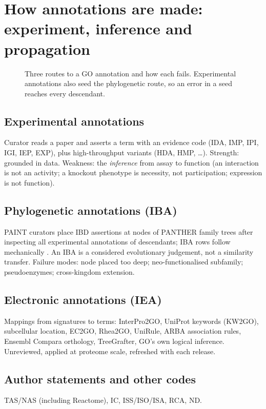 \section{How annotations are made: experiment, inference and propagation}\label{sec:landscape}

\begin{figure}[t]\centering
\resizebox{0.95\linewidth}{!}{}
\caption{Three routes to a GO annotation and how each fails. Experimental annotations also seed
the phylogenetic route, so an error in a seed reaches every descendant.}
\label{fig:provenance}
\end{figure}

\subsection{Experimental annotations}
Curator reads a paper and asserts a term with an evidence code (IDA, IMP, IPI, IGI, IEP, EXP),
plus high-throughput variants (HDA, HMP, \ldots). Strength: grounded in data. Weakness: the
\emph{inference} from assay to function (an interaction is not an activity; a knockout phenotype is
necessity, not participation; expression is not function).

\subsection{Phylogenetic annotations (IBA)}
PAINT curators place IBD assertions at nodes of PANTHER family trees after inspecting all
experimental annotations of descendants; IBA rows follow mechanically \citep{todo-gaudet2011}.
An IBA is a considered evolutionary judgement, not a similarity transfer. Failure modes: node
placed too deep; neo-functionalised subfamily; pseudoenzymes; cross-kingdom extension.

\subsection{Electronic annotations (IEA)}
Mappings from signatures to terms: InterPro2GO, UniProt keywords (KW2GO), subcellular location,
EC2GO, Rhea2GO, UniRule, ARBA association rules, Ensembl Compara orthology, TreeGrafter, GO's own
logical inference. Unreviewed, applied at proteome scale, refreshed with each release.

\subsection{Author statements and other codes}
TAS/NAS (including Reactome), IC, ISS/ISO/ISA, RCA, ND.

\begin{table}[t]\centering\small
\caption{Composition of the reviewed corpus by evidence class and GO aspect, excluding protein binding,
with each class's share of all \goaTotal{} million UniProt-GOA annotations (QuickGO, \goaFetched). The corpus
deliberately over-samples curated evidence: electronic annotations are \goaIeaPct\% of GOA but about a
quarter of the corpus.}
\label{tab:composition}

\end{table}
